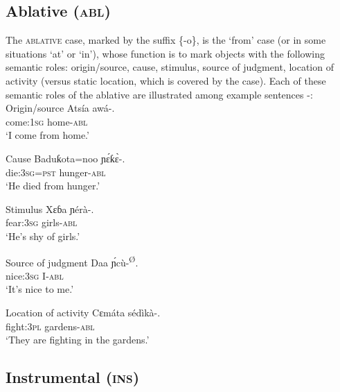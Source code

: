 \subsection{Ablative (\textsc{abl})}\label{sec:7.6}


The \textsc{ablative} case, marked by the suffix \{-o\}, is the ‘from’ case (or in some situations `at' or `in'), whose function is to mark objects with the following semantic roles: origin/source, cause, stimulus, source of judgment, location of activity (versus static location, which is covered by the  case). Each of these semantic roles of the ablative are illustrated among example sentences -:\\



Origin/source
\ea\label{ex:case:26}
\gll Atsía     awá-\textbf{\ᵒ}. \\
come:\textsc{1sg}   home-\textsc{abl}    \\
\glt ‘I come from home.’ 
\z




Cause
\ea\label{ex:case:27}
\gll Baduƙota=noo   ɲ\'{ɛ}ƙ\`{ɛ}{-}\textbf{\ᵓ}. \\
die:\textsc{3sg}=\textsc{pst}     hunger-\textsc{abl}    \\
\glt ‘He died from hunger.’ 
\z




Stimulus
\ea\label{ex:case:28}
\gll Xɛɓa     ɲérà-\textbf{\ᵒ}. \\
fear:\textsc{3sg}   girls-\textsc{abl}    \\
\glt ‘He’s shy of girls.’ 
\z




Source of judgment
\ea\label{ex:case:29}
\gll Daa     \'{ɲ}cù-\textsuperscript{Ø}. \\
nice:\textsc{3sg}   I-\textsc{abl}    \\
\glt ‘It’s nice to me.’ 
\z




Location of activity
\ea\label{ex:case:30}
\gll Cɛmáta   sédìkà-\textbf{\ᵒ}. \\
fight:\textsc{3pl}   gardens-\textsc{abl}    \\
\glt ‘They are fighting in the gardens.’ 
\z






\subsection{Instrumental (\textsc{ins})}\label{sec:7.7}


